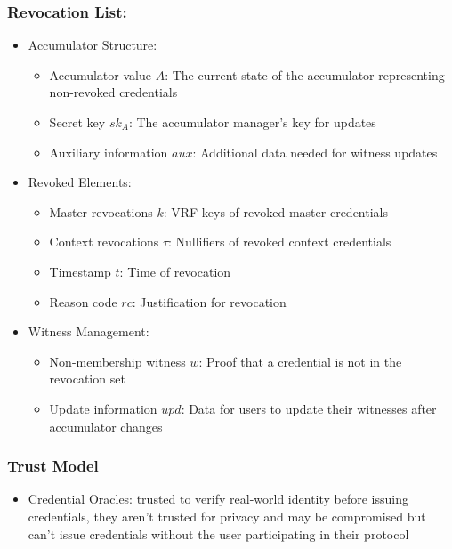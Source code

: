 {\subsubsection{Revocation List:} 
\begin{itemize}
    \item Accumulator Structure:
    \begin{itemize}
        \item Accumulator value $A$: The current state of the accumulator representing non-revoked credentials
        \item Secret key $sk_A$: The accumulator manager's key for updates
        \item Auxiliary information $aux$: Additional data needed for witness updates
    \end{itemize}
    \item Revoked Elements:
    \begin{itemize}
        \item Master revocations $k$: VRF keys of revoked master credentials
        \item Context revocations $\tau$: Nullifiers of revoked context credentials
        \item Timestamp $t$: Time of revocation
        \item Reason code $rc$: Justification for revocation
    \end{itemize}
    \item Witness Management:
    \begin{itemize}
        \item Non-membership witness $w$: Proof that a credential is not in the revocation set
        \item Update information $upd$: Data for users to update their witnesses after accumulator changes
    \end{itemize}
\end{itemize}


\subsubsection{Trust Model}
\begin{itemize}
    \item Credential Oracles: trusted to verify real-world identity before issuing credentials, they aren't trusted for privacy and may be compromised but can't issue credentials without the user participating in their protocol


\end{itemize}}
